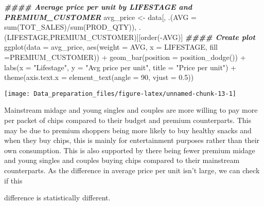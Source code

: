 \documentclass[
]{article}
\newenvironment{Shaded}{\begin{snugshade}}{\end{snugshade}}
\newcommand{\AttributeTok}[1]{\textcolor[rgb]{0.77,0.63,0.00}{#1}}
\newcommand{\DecValTok}[1]{\textcolor[rgb]{0.00,0.00,0.81}{#1}}
\newcommand{\DocumentationTok}[1]{\textcolor[rgb]{0.56,0.35,0.01}{\textbf{\textit{#1}}}}
\newcommand{\FloatTok}[1]{\textcolor[rgb]{0.00,0.00,0.81}{#1}}
\newcommand{\FunctionTok}[1]{\textcolor[rgb]{0.00,0.00,0.00}{#1}}
\newcommand{\NormalTok}[1]{#1}
\newcommand{\OtherTok}[1]{\textcolor[rgb]{0.56,0.35,0.01}{#1}}
\newcommand{\SpecialCharTok}[1]{\textcolor[rgb]{0.00,0.00,0.00}{#1}}
\newcommand{\StringTok}[1]{\textcolor[rgb]{0.31,0.60,0.02}{#1}}
\begin{document}
\begin{Shaded}
\begin{Highlighting}[]
\DocumentationTok{\#\#\#\# Average price per unit by LIFESTAGE and PREMIUM\_CUSTOMER}
\NormalTok{avg\_price }\OtherTok{\textless{}{-}}\NormalTok{ data[, .(}\AttributeTok{AVG =} \FunctionTok{sum}\NormalTok{(TOT\_SALES)}\SpecialCharTok{/}\FunctionTok{sum}\NormalTok{(PROD\_QTY)), .(LIFESTAGE,PREMIUM\_CUSTOMER)][}\FunctionTok{order}\NormalTok{(}\SpecialCharTok{{-}}\NormalTok{AVG)]}
\DocumentationTok{\#\#\#\# Create plot}
\FunctionTok{ggplot}\NormalTok{(}\AttributeTok{data =}\NormalTok{ avg\_price, }\FunctionTok{aes}\NormalTok{(}\AttributeTok{weight =}\NormalTok{ AVG, }\AttributeTok{x =}\NormalTok{ LIFESTAGE, }\AttributeTok{fill =}\NormalTok{PREMIUM\_CUSTOMER)) }\SpecialCharTok{+}
\FunctionTok{geom\_bar}\NormalTok{(}\AttributeTok{position =} \FunctionTok{position\_dodge}\NormalTok{()) }\SpecialCharTok{+}
\FunctionTok{labs}\NormalTok{(}\AttributeTok{x =} \StringTok{"Lifestage"}\NormalTok{, }\AttributeTok{y =} \StringTok{"Avg price per unit"}\NormalTok{, }\AttributeTok{title =} \StringTok{"Price per unit"}\NormalTok{) }\SpecialCharTok{+}
\FunctionTok{theme}\NormalTok{(}\AttributeTok{axis.text.x =} \FunctionTok{element\_text}\NormalTok{(}\AttributeTok{angle =} \DecValTok{90}\NormalTok{, }\AttributeTok{vjust =} \FloatTok{0.5}\NormalTok{))}
\end{Highlighting}
\end{Shaded}

\begin{center}\texttt{[image: Data\_preparation\_files/figure-latex/unnamed-chunk-13-1]} \end{center}

Mainstream midage and young singles and couples are more willing to pay
more per packet of chips compared to their budget and premium
counterparts. This may be due to premium shoppers being more likely to
buy healthy snacks and when they buy chips, this is mainly for
entertainment purposes rather than their own consumption. This is also
supported by there being fewer premium midage and young singles and
couples buying chips compared to their mainstream counterparts. As the
difference in average price per unit isn't large, we can check if this

difference is statistically different.
\end{document}
